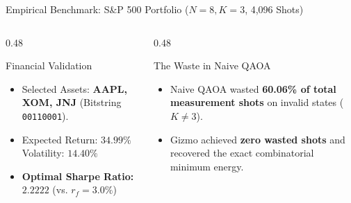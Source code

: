 \documentclass[aspectratio=169,10pt]{beamer}
\begin{document}
\begin{frame}{Empirical Benchmark: S\&P 500 Portfolio ($N=8, K=3$, 4,096 Shots)}
\begin{center}
\end{center}

\vspace{0.2cm}
\begin{columns}
\begin{column}{0.48\textwidth}
\begin{block}{Financial Validation}
\begin{itemize}
    \item Selected Assets: \textbf{AAPL, XOM, JNJ} (Bitstring \texttt{00110001}).
    \item Expected Return: $\mathbf{34.99\%}$ \quad Volatility: $\mathbf{14.40\%}$
    \item \textbf{Optimal Sharpe Ratio:} $\mathbf{2.2222}$ (vs. $r_f = 3.0\%$)
\end{itemize}
\end{block}
\end{column}

\begin{column}{0.48\textwidth}
\begin{alertblock}{The Waste in Naive QAOA}
\begin{itemize}
    \item Naive QAOA wasted \textbf{60.06\% of total measurement shots} on invalid states ($K \neq 3$).
    \item Gizmo achieved \textbf{zero wasted shots} and recovered the exact combinatorial minimum energy.
\end{itemize}
\end{alertblock}
\end{column}
\end{columns}
\end{frame}
\end{document}
